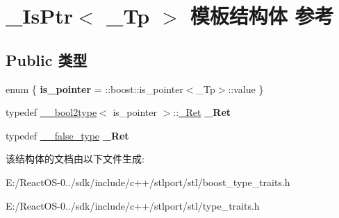 \hypertarget{struct___is_ptr}{}\section{\+\_\+\+Is\+Ptr$<$ \+\_\+\+Tp $>$ 模板结构体 参考}
\label{struct___is_ptr}
\subsection*{Public 类型}
\begin{DoxyCompactItemize}
\item 
\mbox{\label{struct___is_ptr_a37b9958743c6f3b08e8fba9d0b106125}} 
enum \{ {\bfseries is\+\_\+pointer} = \+:\+:boost\+:\+:is\+\_\+pointer$<$\+\_\+\+Tp$>$\+:\+:value
 \}
\item 
\mbox{\label{struct___is_ptr_a0fe5097bd95f154c138b539136e2c6b5}} 
typedef \hyperlink{struct____bool2type}{\+\_\+\+\_\+bool2type}$<$ is\+\_\+pointer $>$\+::\hyperlink{struct____true__type}{\+\_\+\+Ret} {\bfseries \+\_\+\+Ret}
\item 
\mbox{\label{struct___is_ptr_a0c5477d094b94190c12957d31b4b8697}} 
typedef \hyperlink{struct____false__type}{\+\_\+\+\_\+false\+\_\+type} {\bfseries \+\_\+\+Ret}
\end{DoxyCompactItemize}


该结构体的文档由以下文件生成\+:\begin{DoxyCompactItemize}
\item 
E\+:/\+React\+O\+S-\/0../sdk/include/c++/stlport/stl/boost\+\_\+type\+\_\+traits.\+h\item 
E\+:/\+React\+O\+S-\/0../sdk/include/c++/stlport/stl/type\+\_\+traits.\+h\end{DoxyCompactItemize}
